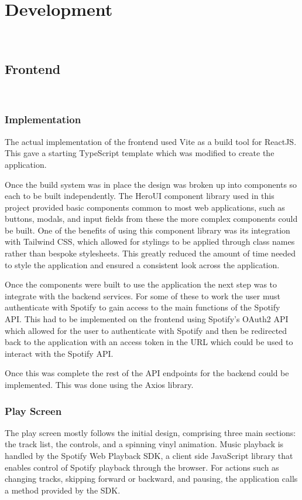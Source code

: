 \chapter{Development}~\label{cha:development}
\section{Frontend}~\label{sec:frontend-development}
\subsection{Implementation}
The actual implementation of the frontend used Vite as a build tool for ReactJS. This gave a starting TypeScript template which was modified to create the application.

Once the build system was in place the design was broken up into components so each to be built independently. The HeroUI component library used in this project provided basic components common to most web applications, such as buttons, modals, and input fields from these the more complex components could be built. One of the benefits of using this component library was its integration with Tailwind CSS, which allowed for stylings to be applied through class names rather than bespoke stylesheets. This greatly reduced the amount of time needed to style the application and ensured a consistent look across the application.

Once the components were built to use the application the next step was to integrate with the backend services. For some of these to work the user must authenticate with Spotify to gain access to the main functions of the Spotify API. This had to be implemented on the frontend using Spotify's OAuth2 API which allowed for the user to authenticate with Spotify and then be redirected back to the application with an access token in the URL which could be used to interact with the Spotify API.

Once this was complete the rest of the API endpoints for the backend could be implemented. This was done using the Axios library.

\subsection{Play Screen}
The play screen mostly follows the initial design, comprising three main sections: the track list, the controls, and a spinning vinyl animation. Music playback is handled by the Spotify Web Playback SDK, a client side JavaScript library that enables control of Spotify playback through the browser. For actions such as changing tracks, skipping forward or backward, and pausing, the application calls a method provided by the SDK.

